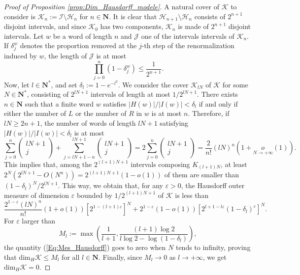 \documentclass[10pt,a4paper]{amsart}
\newcommand{\littleo}[1]{\underset{#1}{o}}
\begin{document}
\begin{proof}[Proof of Proposition \ref{prop:Dim_Hausdorff_modele}]
    A natural cover of $\mathcal{K}$ to consider is $\mathcal{K}_{n}:=\mathcal{I}\setminus\mathcal{H}_{n}$ for $n\in\mathbf{N}$. It is clear that $\mathcal{H}_{n+1}\setminus\mathcal{H}_{n}$ consists of $2^{n+1}$ disjoint intervals, and since $\mathcal{K}_{0}$ has two components, $\mathcal{K}_{n}$ is made of $2^{n+1}$ disjoint intervals. Let $w$ be a word of length $n$ and $\mathcal{J}$ one of the intervals intervals of $\mathcal{K}_{n}$. If $\delta_{j}^{w}$ denotes the proportion removed at the $j$-th step of the renormalization induced by $w$, the length of $\mathcal{J}$ is at most
    \[
    \prod_{j=0}^{n}(1-\delta_{j}^{w})\leq\frac{1}{2^{n+1}}.
    \]
    Now, let $l\in\mathbf{N}^{*}$, and set $\delta_{l}:=1-e^{-l^{2}}$. We consider the cover $\mathcal{K}_{lN}$ of $\mathcal{K}$ for some $N\in\mathbf{N}^{*}$, consisting of $2^{lN+1}$ intervals of length at most $1/2^{lN+1}$. There exists $n\in\mathbf{N}$ such that a finite word $w$ satisfies $\lvert H\left(w\right)\rvert/\lvert I\left(w\right)\rvert<\delta_{l}$ if and only if either the number of $L$ or the number of $R$ in $w$ is at most $n$. Therefore, if $lN\geq2n+1$, the number of words of length $lN+1$ satisfying $\lvert H\left(w\right)\rvert/\lvert I\left(w\right)\rvert<\delta_{l}$ is at most
    \[
    \sum_{j=0}^{n}\left(
    \begin{array}{c}
        lN+1 \\
        j 
    \end{array}\right)
    +\sum_{j=lN+1-n}^{lN+1}\left(
    \begin{array}{c}
        lN+1 \\
        j 
    \end{array}\right)
    =2\sum_{j=0}^{n}\left(
    \begin{array}{c}
        lN+1 \\
        j 
    \end{array}\right)=\frac{2}{n!}(lN)^{n}(1+\littleo{N\rightarrow+\infty}(1)).
    \]
    This implies that, among the $2^{(l+1)N+1}$ intervals composing $K_{(l+1)N}$, at least $2^{N}(2^{lN+1}-O(N^{n}))=2^{(l+1)N+1}(1-o(1))$ of them are smaller than $(1-\delta_{l})^{N}/2^{lN+1}$. This way, we obtain that, for any $\varepsilon>0$, the Hausdorff outer measure of dimension $\varepsilon$ bounded by $1/2^{(l+1)N+1}$ of $\mathcal{K}$ is less than
    \begin{equation}
    \label{Eq:Mes_Hausdorff}
      \frac{2^{1-\varepsilon}(lN)^{n}}{n!}(1+o(1))\left[2^{1-(l+1)\varepsilon}\right]^{N}+2^{1-\varepsilon}(1-o(1))\left[2^{l+1-l\varepsilon}(1-\delta_{l})^{\varepsilon}\right]^{N}.  
    \end{equation}
    For $\varepsilon$ larger than
    \[
    M_{l}:=\max\left(\frac{1}{l+1},\frac{(l+1)\log2}{l\log2-\log(1-\delta_{l})}\right),
    \]
    the quantity (\ref{Eq:Mes_Hausdorff}) goes to zero when $N$ tends to infinity, proving that $\text{dim}_{H}\mathcal{K}\leq M_{l}$ for all $l\in\mathbf{N}$. Finally, since $M_{l}\rightarrow0$ as $l\rightarrow+\infty$, we get $\text{dim}_{H}\mathcal{K}=0$.
\end{proof}
\end{document}
